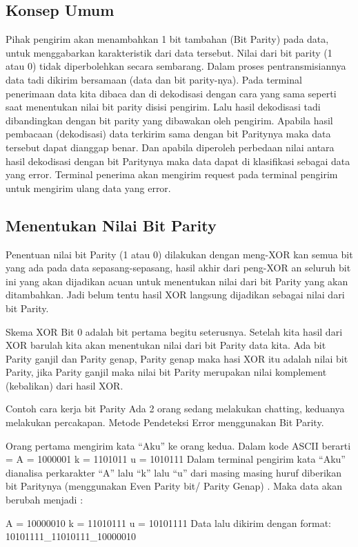 \subsection{Konsep Umum}
Pihak pengirim akan menambahkan 1 bit tambahan (Bit Parity) pada data, untuk menggabarkan karakteristik dari data tersebut. Nilai dari bit parity (1 atau 0) tidak diperbolehkan secara sembarang. Dalam proses pentransmisiannya data tadi dikirim bersamaan (data dan bit parity-nya). Pada terminal penerimaan data kita dibaca dan di dekodisasi dengan cara yang sama seperti saat menentukan nilai bit parity disisi pengirim. Lalu hasil dekodisasi tadi dibandingkan dengan bit parity yang dibawakan oleh pengirim.
Apabila hasil pembacaan (dekodisasi) data terkirim sama dengan bit Paritynya maka data tersebut dapat dianggap benar. Dan apabila diperoleh perbedaan nilai antara hasil dekodisasi dengan bit Paritynya maka data dapat di klasifikasi sebagai data yang error. Terminal penerima akan mengirim request pada terminal pengirim untuk mengirim ulang data yang error.
 
\subsection{Menentukan Nilai Bit Parity}
Penentuan nilai bit Parity (1 atau 0) dilakukan dengan meng-XOR kan semua bit yang ada pada data sepasang-sepasang, hasil akhir dari peng-XOR an seluruh bit ini yang akan dijadikan acuan untuk menentukan nilai dari bit Parity yang akan ditambahkan. Jadi belum tentu hasil XOR langsung dijadikan sebagai nilai dari bit Parity.

Skema XOR
 Bit 0 adalah bit pertama begitu seterusnya. Setelah kita hasil dari XOR barulah kita akan menentukan nilai dari bit Parity data kita. Ada bit Parity ganjil dan Parity genap, Parity genap maka hasi XOR itu adalah nilai bit Parity, jika Parity ganjil maka nilai bit Parity merupakan nilai komplement (kebalikan) dari hasil XOR.

Contoh cara kerja bit Parity
Ada 2 orang sedang melakukan chatting, keduanya melakukan percakapan. Metode Pendeteksi Error menggunakan Bit Parity.

Orang pertama mengirim kata “Aku” ke orang kedua.
Dalam kode ASCII berarti =
A = 1000001
k = 1101011
u = 1010111
Dalam terminal pengirim kata “Aku” dianalisa perkarakter “A” lalu “k” lalu “u”  dari masing masing huruf diberikan bit Paritynya (menggunakan Even Parity bit/ Parity Genap) . Maka data akan berubah menjadi :

A = 10000010
k = 11010111
u = 10101111
Data lalu dikirim dengan format: 10101111_11010111_10000010


